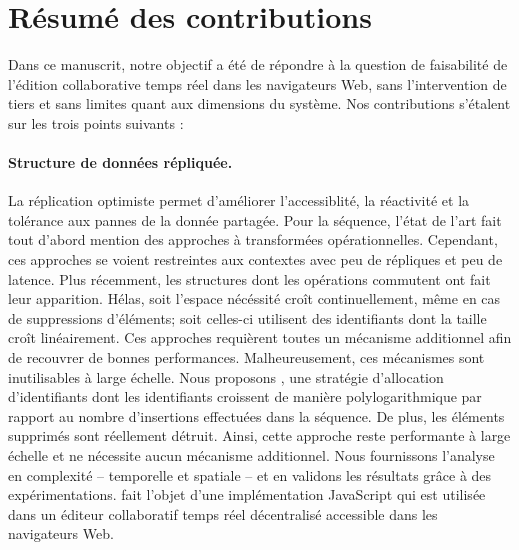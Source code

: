 
\section{Résumé des contributions}
\label{conclu:sec:summary}


Dans ce manuscrit, notre objectif a été de répondre à la question de faisabilité
de l'édition collaborative temps réel dans les navigateurs Web, sans
l'intervention de tiers et sans limites quant aux dimensions du système. Nos
contributions s'étalent sur les trois points suivants :

\paragraph{Structure de données répliquée.} La réplication optimiste permet
d'améliorer l'accessiblité, la réactivité et la tolérance aux pannes de la
donnée partagée. Pour la séquence, l'état de l'art fait tout d'abord mention des
approches à transformées opérationnelles. Cependant, ces approches se voient
restreintes aux contextes avec peu de répliques et peu de latence. Plus
récemment, les structures dont les opérations commutent ont fait leur
apparition. Hélas, soit l'espace nécéssité croît continuellement, même en cas de
suppressions d'éléments; soit celles-ci utilisent des identifiants dont la
taille croît linéairement. Ces approches requièrent toutes un mécanisme
additionnel afin de recouvrer de bonnes performances. Malheureusement, ces
mécanismes sont inutilisables à large échelle. Nous proposons \LSEQ, une
stratégie d'allocation d'identifiants dont les identifiants croissent de manière
polylogarithmique par rapport au nombre d'insertions effectuées dans la
séquence. De plus, les éléments supprimés sont réellement détruit. Ainsi, cette
approche reste performante à large échelle et ne nécessite aucun mécanisme
additionnel.  Nous fournissons l'analyse en complexité -- temporelle et spatiale
-- et en validons les résultats grâce à des expérimentations. \LSEQ fait l'objet
d'une implémentation JavaScript qui est utilisée dans un éditeur collaboratif
temps réel décentralisé accessible dans les navigateurs Web.

